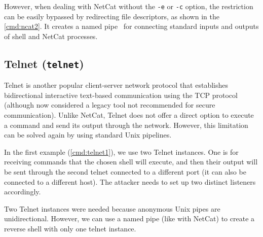 
However, when dealing with NetCat without the \texttt{-e} or \texttt{-c} option, the restriction can be easily bypassed by redirecting file descriptors, as shown in the \cref{cmd:ncat2}. It creates a named pipe \tmp\ for connecting standard inputs and outputs of shell and NetCat processes.


\subsection{Telnet (\texttt{telnet})}
\label{sec:telnet}


Telnet is another popular client-server network protocol that establishes bidirectional interactive text-based communication using the TCP protocol (although now considered a legacy tool not recommended for secure communication). Unlike NetCat, Telnet does not offer a direct option to execute a command and send its output through the network. However, this limitation can be solved again by using standard Unix pipelines.

In the first example (\cref{cmd:telnet1}), we use two Telnet instances. One is for receiving commands that the chosen shell will execute, and then their output will be sent through the second telnet connected to a different port (it can also be connected to a different host). The attacker needs to set up two distinct listeners accordingly.


Two Telnet instances were needed because anonymous Unix pipes are unidirectional. However, we can use a named pipe (like with NetCat) to create a reverse shell with only one telnet instance.

